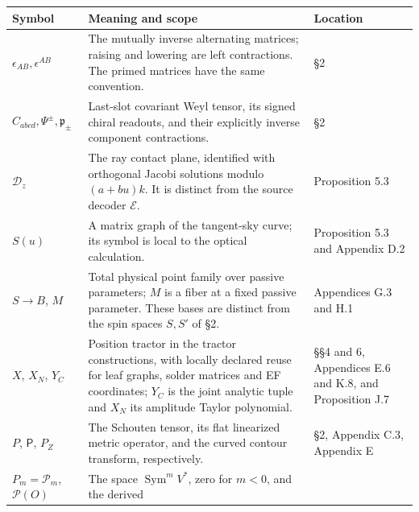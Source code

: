 \documentclass[
  english,
  11pt,
  reqno]{amsart}
\newcounter{none} %
\begin{document}
{\def\LTcaptype{none} %
\begin{longtable}[]{@{}
  >{\raggedright\arraybackslash}p{}
  >{\raggedright\arraybackslash}p{}
  >{\raggedright\arraybackslash}p{}@{}}
\toprule\noalign{}
\begin{minipage}[b]{\linewidth}\raggedright
Symbol
\end{minipage} & \begin{minipage}[b]{\linewidth}\raggedright
Meaning and scope
\end{minipage} & \begin{minipage}[b]{\linewidth}\raggedright
Location
\end{minipage} \\
\midrule\noalign{}
\endhead
\bottomrule\noalign{}
\endlastfoot
\(\epsilon_{AB},\epsilon^{AB}\) & The mutually inverse alternating
matrices; raising and lowering are left contractions. The primed
matrices have the same convention. & §2 \\
\(C_{abcd},\Psi^\pm,\mathfrak p_\pm\) & Last-slot covariant Weyl tensor,
its signed chiral readouts, and their explicitly inverse component
contractions. & §2 \\
\(\mathcal D_z\) & The ray contact plane, identified with orthogonal
Jacobi solutions modulo \((a+bu)k\). It is distinct from the source
decoder \(\mathcal E\). & Proposition 5.3 \\
\(S(u)\) & A matrix graph of the tangent-sky curve; its symbol is local
to the optical calculation. & Proposition 5.3 and Appendix D.2 \\
\(S\to B\), \(M\) & Total physical point family over passive parameters;
\(M\) is a fiber at a fixed passive parameter. These bases are distinct
from the spin spaces \(S,S'\) of §2. & Appendices G.3 and H.1 \\
\(X\), \(X_N\), \(Y_C\) & Position tractor in the tractor constructions,
with locally declared reuse for leaf graphs, solder matrices and EF
coordinates; \(Y_C\) is the joint analytic tuple and \(X_N\) its
amplitude Taylor polynomial. & §§4 and 6, Appendices E.6 and K.8, and
Proposition J.7 \\
\(P\), \(\mathsf P\), \(P_Z\) & The Schouten tensor, its flat linearized
metric operator, and the curved contour transform, respectively. & §2,
Appendix C.3, Appendix E \\
\(P_m=\mathcal P_m\), \(\mathcal P(O)\) & The space
\(\operatorname{Sym}^mV^*\), zero for \(m<0\), and the derived

\end{longtable}}
\end{document}
